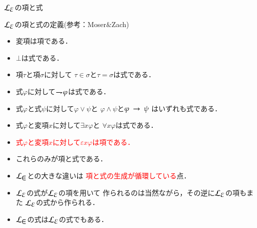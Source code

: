 \documentclass[dvipdfmx,10pt,notheorems]{beamer}
\theoremstyle{definition}
\newcommand{\lang}[1]{\mathcal{L}_{\scalebox{1.2}{$#1$}}} %
\newcommand{\negation}{\rightharpoondown\hspace{-0.25em}} %
\newcommand{\rarrow}{\hspace{0.25em}\rightarrow\hspace{0.25em}} %
\begin{document}
\begin{frame}{$\lang{\varepsilon}$の項と式}
	\begin{exampleblock}{$\lang{\varepsilon}$の項と式の定義(参考：Moser$\&$Zach\cite{Moser_Zach})}
		\begin{itemize}
			\item 変項は項である．
			\item $\bot$は式である．
			\item 項$\tau$と項$\sigma$に対して
				$\tau \in \sigma$と$\tau = \sigma$は式である．
			\item 式$\varphi$に対して$\negation \varphi$は式である．
			\item 式$\varphi$と式$\psi$に対して$\varphi \vee \psi$と
				$\varphi \wedge \psi$と$\varphi \rarrow \psi$
				はいずれも式である．
			\item 式$\varphi$と変項$x$に対して$\exists x \varphi$と
				$\forall x \varphi$は式である．
			\item \textcolor{red}{式$\varphi$と変項$x$に対して$\varepsilon x \varphi$は項である．}
			\item これらのみが項と式である．
		\end{itemize}
	\end{exampleblock}
	
	\begin{itemize}
		\item $\lang{\in}$との大きな違いは
		 \textcolor{red}{項と式の生成が循環している}点．
		
		\item$\lang{\varepsilon}$の式が$\lang{\varepsilon}$の項を用いて
			作られるのは当然ながら，その逆に$\lang{\varepsilon}$の項もまた
			$\lang{\varepsilon}$の式から作られる．
			
		\item $\lang{\in}$の式は$\lang{\varepsilon}$の式でもある．
	\end{itemize}
\end{frame}
\end{document}
